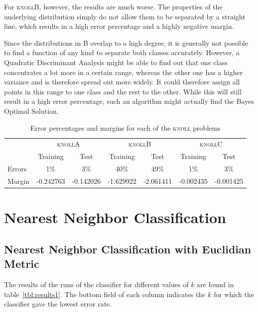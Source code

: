 \documentclass{article}
\newcommand{\knollA}{\textsc{knollA}\xspace}
\newcommand{\knollB}{\textsc{knollB}\xspace}
\newcommand{\knollC}{\textsc{knollC}\xspace}
\begin{document}
For \knollB, however, the results are much worse. The properties of the underlying distribution simply
do not allow them to be separated by a straight line, which results in a high error percentage and a highly negative margin.

Since the distributions in B overlap to a high degree, it is generally not possible to find a function of any kind
to separate both classes accurately. However, a Quadratic Discriminant Analysis might be able to find out that one class
concentrates a lot more in a certain range, whereas the other one has a higher variance and is therefore spread out more widely.
It could therefore assign all points in this range to one class and the rest to the other. While this will still result in a high
error percentage, such an algorithm might actually find the Bayes Optimal Solution.

\begin{table}[h!]
  \centering
  \begin{tabular}{l|c|c|c|c|c|c}
    & \multicolumn{2}{c|}{\knollA} & \multicolumn{2}{|c|}{\knollB} & \multicolumn{2}{|c}{\knollC} \\
    & Training & Test & Training & Test & Training & Test \\
    \hline
    Errors & 1\% & 3\% & 40\% & 49\% & 1\% & 3\% \\ 
    Margin & -0.242763 & -0.142026 & -1.629922 & -2.061411 & -0.002435 & -0.001425 \\
  \end{tabular}
  \caption{Error percentages and margins for each of the \textsc{knoll} problems}
  \label{tab:ldaknollerror}
\end{table}

\newpage
\section{Nearest Neighbor Classification}

\subsection{Nearest Neighbor Classification with Euclidian Metric}

The results of the runs of the classifier for different values of $k$
are found in table~\ref{tbl:results1}. The bottom field of each column
indicates the $k$ for which the classifier gave the lowest error rate.
\end{document}

